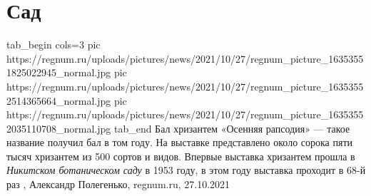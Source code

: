  
 
 
 
 
\chapter{Сад}

\ifcmt
  tab_begin cols=3
     pic https://regnum.ru/uploads/pictures/news/2021/10/27/regnum_picture_16353551825022945_normal.jpg
     pic https://regnum.ru/uploads/pictures/news/2021/10/27/regnum_picture_16353552514365664_normal.jpg
		 pic https://regnum.ru/uploads/pictures/news/2021/10/27/regnum_picture_16353552035110708_normal.jpg
  tab_end
\fi
Бал хризантем «Осенняя рапсодия» — такое название получил бал в том году. На
выставке представлено около сорока пяти тысяч хризантем из 500 сортов и видов.
Впервые выставка хризантем прошла в \emph{Никитском ботаническом саду} в 1953 году, в
этом году выставка проходит в 68-й раз
, 
Александр Полегенько, regnum.ru, 27.10.2021


